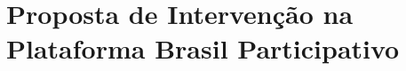 \section{Proposta de Intervenção na Plataforma Brasil Participativo}
\label{sec:proposta_de_intervencao_na_plataforma_brasil_participativo}